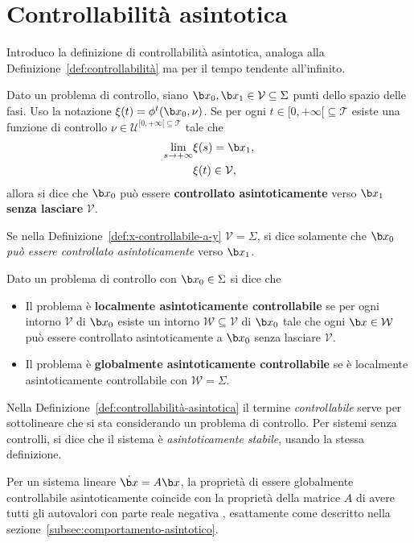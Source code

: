 \section{Controllabilità asintotica}
Introduco la definizione di controllabilità asintotica, analoga alla
Definizione~\ref{def:controllabilità} ma per il tempo tendente all'infinito.
\begin{definition}
    Dato un problema di controllo, siano
     $\b x_0, \b x_1 \in \mathcal V \subseteq \Sigma$ punti dello spazio delle fasi.
    Uso la notazione $\xi(t) = \phi^t(\b x_0, \nu)$.
    Se per ogni $t \in[0, +\infty[ \subseteq \mathcal T$
    esiste una funzione di controllo $\nu \in  \mathcal U^{[0, +\infty[ \subseteq \mathcal T}$ tale che
    \begin{align*}
       \lim_{s \to +\infty} &\xi(s) = \b x_1,\\
       &\xi(t) \in \mathcal V,
    \end{align*}
    allora si dice che $\b x_0$ può essere \textbf{controllato asintoticamente} verso
    $\b x_1$ \textbf{senza lasciare} $\mathcal V$.
    \label{def:x-controllabile-a-y}
\end{definition}
Se nella Definizione~\ref{def:x-controllabile-a-y} $\mathcal V = \Sigma$,
si dice solamente che
$\b x_0$ \emph{può essere controllato asintoticamente} verso $\b x_1$.
\begin{definition}
    Dato un problema di controllo con $\b x_0 \in \Sigma$ si dice che
    \begin{itemize}
        \item Il problema è \textbf{localmente asintoticamente controllabile}
        se per ogni intorno $\mathcal V$ di $\b x_0$ esiste un intorno
        $\mathcal W \subseteq \mathcal V$ di $\b x_0$ tale che ogni $\b x \in \mathcal W$
        può essere controllato asintoticamente a $\b x_0$ senza lasciare $\mathcal V$.

        \item Il problema è \textbf{globalmente asintoticamente controllabile} se
        è localmente asintoticamente controllabile con $\mathcal W = \Sigma$.
    \end{itemize}
    \label{def:controllabilità-asintotica}
\end{definition}
Nella Definizione~\ref{def:controllabilità-asintotica} il termine \emph{controllabile}
serve per sottolineare che si sta considerando un problema di controllo.
Per sistemi senza controlli, si dice che il sistema è \emph{asintoticamente stabile}, usando la
stessa definizione.

Per un sistema lineare $\dot {\b x} = A \b x$, la proprietà di essere globalmente
controllabile asintoticamente coincide con 
la proprietà della matrice $A$ di avere tutti gli autovalori con parte reale negativa \cite{sontagMath}, esattamente
come descritto nella sezione~\ref{subsec:comportamento-asintotico}.